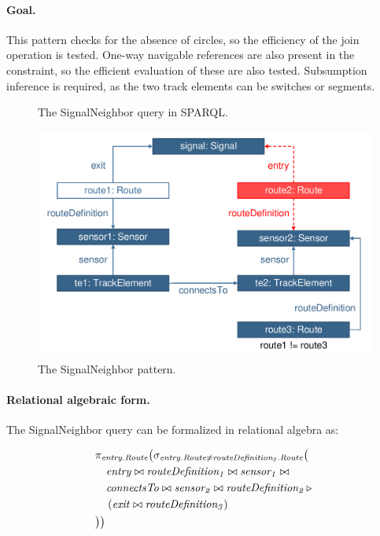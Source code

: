 \paragraph{Goal.} This pattern checks for the absence of circles, so the efficiency of the join operation is tested. One-way navigable references are also present in the constraint, so the efficient evaluation of these are also tested. Subsumption inference is required, as the two track elements can be switches or segments.

\begin{figure}[htb]
\centering
\begin{minipage}{0.6\textwidth}
  { \alignListing
    }
  \caption{The \textsf{SignalNeighbor} query in SPARQL.}
  \label{lst:signalneighbor-sparql}
\end{minipage}
\end{figure}

\begin{figure}[htb]
		\centering
		\includegraphics[scale=0.4]{figures/trainbenchmark-signalneighbor}
		\caption{The \textsf{SignalNeighbor} pattern.}
		\label{fig:trainbenchmark-signalneighbor}
\end{figure}

\paragraph{Relational algebraic form.} The \textsf{SignalNeighbor} query can be formalized in relational algebra as:

\begin{align*}
& \pi_{\mathit{entry.Route}} \big( \sigma_{\mathit{entry.Route} \neq \mathit{routeDefinition_2.Route}} \big( \\
& \quad \mathit{entry} \bowtie \mathit{routeDefinition_1} \bowtie \mathit{sensor_1} \bowtie \\
& \quad \mathit{connectsTo} \bowtie \mathit{sensor_2} \bowtie \mathit{routeDefinition_2} \, \triangleright \, \\
& \quad \left( \mathit{exit} \bowtie \mathit{routeDefinition_3} \right) \\
& \big) \big)
\end{align*}

